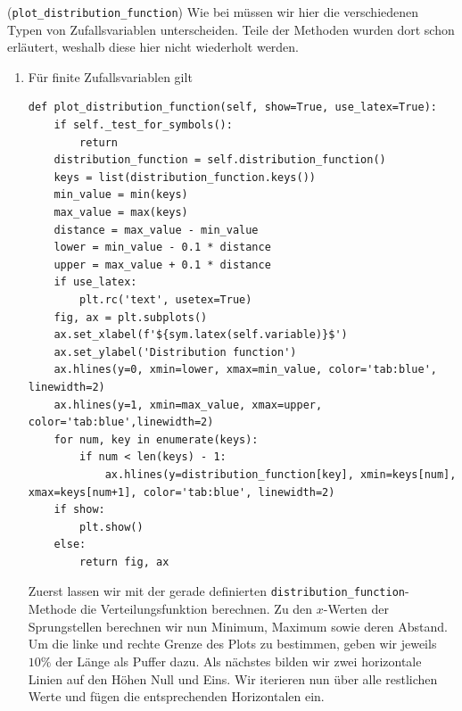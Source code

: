 \begin{Code}{(\lstinline|plot_distribution_function|)}
\hypertarget{Code:PlotDistr}{}Wie bei \hyperlink{Code:PlotDensity}{} müssen wir hier die verschiedenen Typen von Zufallsvariablen unterscheiden. Teile der Methoden wurden dort schon erläutert, weshalb diese hier nicht wiederholt werden.
\begin{enumerate}[label=(\roman*)]
\item Für finite Zufallsvariablen gilt
\begin{lstlisting}
def plot_distribution_function(self, show=True, use_latex=True):
    if self._test_for_symbols():
        return
    distribution_function = self.distribution_function()
    keys = list(distribution_function.keys())
    min_value = min(keys)
    max_value = max(keys)
    distance = max_value - min_value
    lower = min_value - 0.1 * distance
    upper = max_value + 0.1 * distance
    if use_latex:
        plt.rc('text', usetex=True)
    fig, ax = plt.subplots()
    ax.set_xlabel(f'${sym.latex(self.variable)}$')
    ax.set_ylabel('Distribution function')
    ax.hlines(y=0, xmin=lower, xmax=min_value, color='tab:blue', linewidth=2)
    ax.hlines(y=1, xmin=max_value, xmax=upper, color='tab:blue',linewidth=2)
    for num, key in enumerate(keys):
        if num < len(keys) - 1:
            ax.hlines(y=distribution_function[key], xmin=keys[num], xmax=keys[num+1], color='tab:blue', linewidth=2)
    if show:
        plt.show()
    else:
        return fig, ax
\end{lstlisting}
Zuerst lassen wir mit der gerade definierten \lstinline|distribution_function|-Methode die Verteilungsfunktion berechnen. Zu den $x$-Werten der Sprungstellen berechnen wir nun Minimum, Maximum sowie deren Abstand. Um die linke und rechte Grenze des Plots zu bestimmen, geben wir jeweils $10 \%$ der Länge als Puffer dazu. Als nächstes bilden wir zwei horizontale Linien auf den Höhen Null und Eins. Wir iterieren nun über alle restlichen Werte und fügen die entsprechenden Horizontalen ein.


\end{enumerate}
\end{Code}
